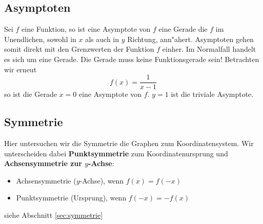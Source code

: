 \subsection{Asymptoten}
Sei $f$ eine Funktion, so ist eine Asymptote von $f$ eine Gerade die $f$ im Unendlichen, sowohl in $x$ als auch in $y$ Richtung, ann"ahert. Asymptoten gehen somit direkt mit den Grenzwerten der Funktion $f$ einher. Im Normalfall handelt es sich um eine Gerade. Die Gerade muss keine Funktionsgerade sein! Betrachten wir erneut 
\begin{equation*}
f(x) = \frac{1}{x-1}
\end{equation*}
so ist die Gerade $x=0$ eine Asymptote von $f$. $y=1$ ist die triviale Asymptote.

 \subsection{Symmetrie}
 Hier untersuchen wir die Symmetrie die Graphen zum Koordinatensystem. Wir unterscheiden dabei \textbf{Punktsymmetrie} zum Koordinatenursprung und \textbf{Achsensymmetrie zur $y$-Achse}:
 \begin{itemize}
 \item Achsensymmetrie ($y$-Achse), wenn $f(x)=f(-x)$
 \item Punktsymmetrie (Ursprung), wenn $f(-x)=-f(x)$
 \end{itemize}
 siehe Abschnitt \ref{sec:symmetrie}


